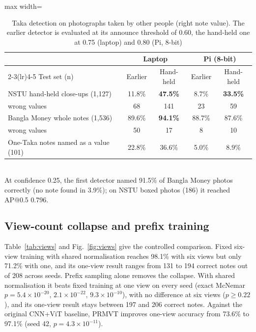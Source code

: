 \documentclass[preprint,12pt]{elsarticle}
\begin{document}
\begin{table}[!htbp]
\caption{Taka detection on photographs taken by other people (right note value). The earlier detector is evaluated at its announce threshold of 0.60, the hand-held one at 0.75 (laptop) and 0.80 (Pi, 8-bit)}
\label{tab:det}
\centering\small
\begin{adjustbox}{max width=\textwidth}\begin{tabular}{@{}lcccc@{}}
\toprule
& \multicolumn{2}{c}{Laptop} & \multicolumn{2}{c}{Pi (8-bit)} \\ \cmidrule(lr){2-3}\cmidrule(lr){4-5}
Test set (n) & Earlier & Hand-held & Earlier & Hand-held \\ \midrule
NSTU hand-held close-ups (1,127) & 11.8\% & \textbf{47.5\%} & 8.7\% & \textbf{33.5\%} \\
\quad wrong values & 68 & 141 & 23 & 59 \\
Bangla Money whole notes (1,536) & 89.6\% & \textbf{94.1\%} & 88.7\% & 87.6\% \\
\quad wrong values & 50 & 17 & 8 & 10 \\
One-Taka notes named as a value (101) & 22.8\% & 36.6\% & 5.0\% & 8.9\% \\ \bottomrule
\end{tabular}\end{adjustbox}\\[3pt]
{\footnotesize At confidence 0.25, the first detector named 91.5\% of Bangla Money photos correctly (no note found in 3.9\%); on NSTU boxed photos (186) it reached AP@0.5 0.796.}
\end{table}

\subsection{View-count collapse and prefix training}
\label{sec:res_views}
Table~\ref{tab:views} and Fig.~\ref{fig:views} give the controlled comparison. Fixed six-view training with shared normalisation reaches 98.1\% with six views but only 71.2\% with one, and its one-view result ranges from 131 to 194 correct notes out of 208 across seeds. Prefix sampling alone removes the collapse. With shared normalisation it beats fixed training at one view on every seed (exact McNemar $p=5.4\times10^{-20}$, $2.1\times10^{-22}$, $9.3\times10^{-10}$), with no difference at six views ($p\ge0.22$), and its one-view result stays between 197 and 206 correct notes. Against the original CNN+ViT baseline, PRMVT improves one-view accuracy from 73.6\% to 97.1\% (seed 42, $p=4.3\times10^{-11}$).
\end{document}
